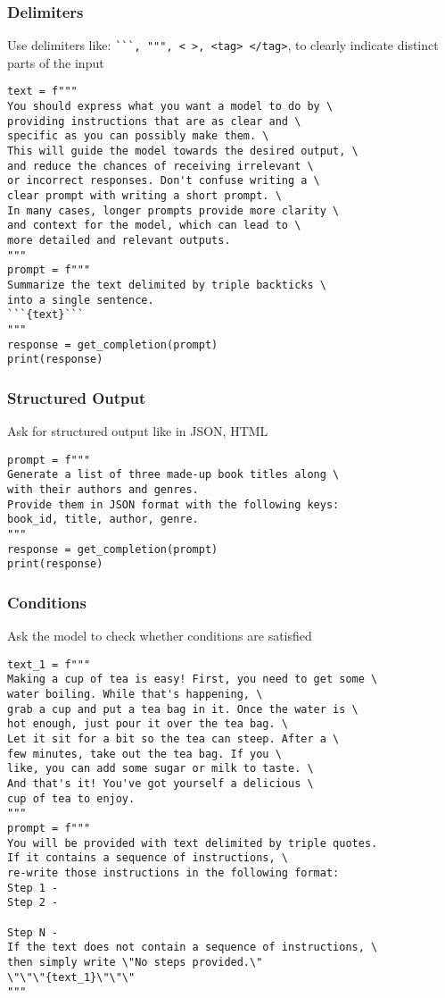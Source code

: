 \begin{frame}[fragile]\frametitle{Delimiters}

Use delimiters like: \lstinline|```, """, < >, <tag> </tag>|,  to clearly indicate distinct parts of the input

\begin{lstlisting}
text = f"""
You should express what you want a model to do by \ 
providing instructions that are as clear and \ 
specific as you can possibly make them. \ 
This will guide the model towards the desired output, \ 
and reduce the chances of receiving irrelevant \ 
or incorrect responses. Don't confuse writing a \ 
clear prompt with writing a short prompt. \ 
In many cases, longer prompts provide more clarity \ 
and context for the model, which can lead to \ 
more detailed and relevant outputs.
"""
prompt = f"""
Summarize the text delimited by triple backticks \ 
into a single sentence.
```{text}```
"""
response = get_completion(prompt)
print(response)
\end{lstlisting}
		
		
\end{frame}

\begin{frame}[fragile]\frametitle{Structured Output}

Ask for structured output like in JSON, HTML

\begin{lstlisting}
prompt = f"""
Generate a list of three made-up book titles along \ 
with their authors and genres. 
Provide them in JSON format with the following keys: 
book_id, title, author, genre.
"""
response = get_completion(prompt)
print(response)
\end{lstlisting}
		
		
\end{frame}


\begin{frame}[fragile]\frametitle{Conditions}

Ask the model to check whether conditions are satisfied

{\tiny
\begin{lstlisting}
text_1 = f"""
Making a cup of tea is easy! First, you need to get some \ 
water boiling. While that's happening, \ 
grab a cup and put a tea bag in it. Once the water is \ 
hot enough, just pour it over the tea bag. \ 
Let it sit for a bit so the tea can steep. After a \ 
few minutes, take out the tea bag. If you \ 
like, you can add some sugar or milk to taste. \ 
And that's it! You've got yourself a delicious \ 
cup of tea to enjoy.
"""
prompt = f"""
You will be provided with text delimited by triple quotes. 
If it contains a sequence of instructions, \ 
re-write those instructions in the following format:
Step 1 -
Step 2 -

Step N -
If the text does not contain a sequence of instructions, \ 
then simply write \"No steps provided.\"
\"\"\"{text_1}\"\"\"
"""
\end{lstlisting}
}
		
\end{frame}


